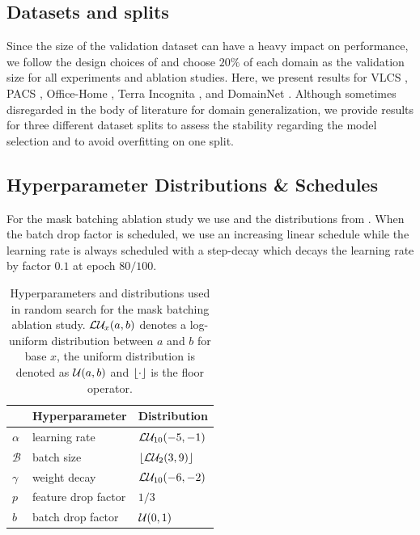 \subsection{Datasets and splits}
Since the size of the validation dataset can have a heavy impact on performance, we follow the design choices of \domainbed and choose $20\%$ of each domain as the validation size for all experiments and ablation studies. Here, we present results for VLCS \citep{FangXR13}, PACS \citep{LiYSH17}, Office-Home \citep{VenkateswaraECP17}, Terra Incognita \citep{BeeryHP18}, and DomainNet \citep{PengBXHSW19}. Although sometimes disregarded in the body of literature for domain generalization, we provide results for three different dataset splits to assess the stability regarding the model selection and to avoid overfitting on one split. 

\subsection{Hyperparameter Distributions \& Schedules}
\label{sec:abl-distr}
For the mask batching ablation study we use \adam \cite{Kingma2015} and the distributions from . When the batch drop factor is scheduled, we use an increasing linear schedule while the learning rate is always scheduled with a step-decay which decays the learning rate by factor $0.1$ at epoch $80/100$.
\begin{table}[!htbp]
    \centering
    \begin{tabular}{lll}
        \toprule
         & \textbf{Hyperparameter} & \textbf{Distribution} \\
        \midrule
        $\alpha$ & learning rate & $\mathcal{L}\mathcal{U}_{10}(-5, -1)$ \\
        $\mathcal{B}$ & batch size  & $\lfloor\mathcal{L}\mathcal{U}_{2}(3, 9)\rfloor$ \\
        $\gamma$ & weight decay  & $\mathcal{L}\mathcal{U}_{10}(-6, -2)$ \\
        $p$ & feature drop factor  & $1/3$ \\
        $b$ & batch drop factor  & $\mathcal{U}(0, 1)$ \\
         \bottomrule 
    \end{tabular}
    \caption[Hyperparameters and distributions used for the mask batching ablation study]{Hyperparameters and distributions used in random search for the mask batching ablation study. $\mathcal{L}\mathcal{U}_{x}(a, b)$ denotes a log-uniform distribution between $a$ and $b$ for base $x$, the uniform distribution is denoted as $\mathcal{U}(a, b)$ and $\lfloor\cdot\rfloor$ is the floor operator.}
    \label{tab:abl-distributions-mask-batching}
\end{table}


